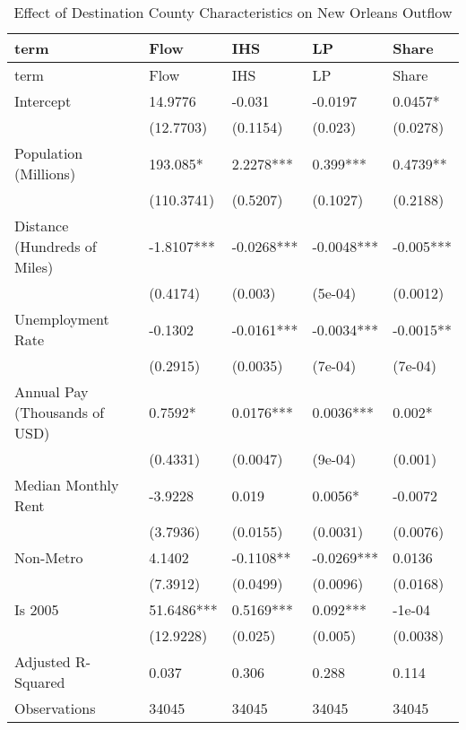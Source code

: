 \documentclass[]{article}
\begin{document}
\begin{longtable}[]{@{}lllll@{}}
\caption{\label{tab:reg_main}Effect of Destination County
Characteristics on New Orleans Outflow}\tabularnewline
\toprule
term & Flow & IHS & LP & Share\tabularnewline
\midrule
\endfirsthead
\toprule
term & Flow & IHS & LP & Share\tabularnewline
\midrule
\endhead
Intercept & 14.9776 & -0.031 & -0.0197 & 0.0457*\tabularnewline
& (12.7703) & (0.1154) & (0.023) & (0.0278)\tabularnewline
Population (Millions) & 193.085* & 2.2278*** & 0.399*** &
0.4739**\tabularnewline
& (110.3741) & (0.5207) & (0.1027) & (0.2188)\tabularnewline
Distance (Hundreds of Miles) & -1.8107*** & -0.0268*** & -0.0048*** &
-0.005***\tabularnewline
& (0.4174) & (0.003) & (5e-04) & (0.0012)\tabularnewline
Unemployment Rate & -0.1302 & -0.0161*** & -0.0034*** &
-0.0015**\tabularnewline
& (0.2915) & (0.0035) & (7e-04) & (7e-04)\tabularnewline
Annual Pay (Thousands of USD) & 0.7592* & 0.0176*** & 0.0036*** &
0.002*\tabularnewline
& (0.4331) & (0.0047) & (9e-04) & (0.001)\tabularnewline
Median Monthly Rent & -3.9228 & 0.019 & 0.0056* & -0.0072\tabularnewline
& (3.7936) & (0.0155) & (0.0031) & (0.0076)\tabularnewline
Non-Metro & 4.1402 & -0.1108** & -0.0269*** & 0.0136\tabularnewline
& (7.3912) & (0.0499) & (0.0096) & (0.0168)\tabularnewline
Is 2005 & 51.6486*** & 0.5169*** & 0.092*** & -1e-04\tabularnewline
& (12.9228) & (0.025) & (0.005) & (0.0038)\tabularnewline
Adjusted R-Squared & 0.037 & 0.306 & 0.288 & 0.114\tabularnewline
Observations & 34045 & 34045 & 34045 & 34045\tabularnewline
\bottomrule
\end{longtable}

\newpage

\scriptsize
\end{document}
